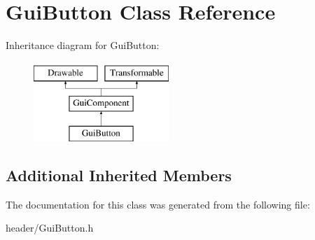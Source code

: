 \hypertarget{class_gui_button}{}\section{Gui\+Button Class Reference}
\label{class_gui_button}
Inheritance diagram for Gui\+Button\+:\begin{figure}[H]
\begin{center}
\leavevmode
\includegraphics[height=3.000000cm]{class_gui_button}
\end{center}
\end{figure}
\subsection*{Additional Inherited Members}


The documentation for this class was generated from the following file\+:\begin{DoxyCompactItemize}
\item 
header/Gui\+Button.\+h\end{DoxyCompactItemize}
